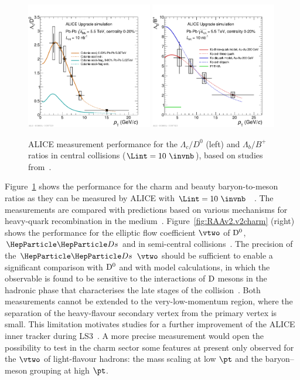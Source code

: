 \begin{figure}[!t]
\centering
\includegraphics[width=0.49\textwidth]{hf/figures/ALICE_LcOverD_YR.pdf}
\includegraphics[width=0.49\textwidth]{hf/figures/ALICE_LbOverB_YR.pdf}
\caption{ALICE measurement performance for the $\Lambda_c/D^0$ (left) and $\Lambda_b/B^+$ ratios in central \PbPb collisions ($\Lint=10~\invnb$), based on studies from~\cite{Abelev:1625842}.}
\label{fig:HFLcLb}
\end {figure}

Figure~\ref{fig:HFLcLb} shows the performance for the charm and beauty baryon-to-meson ratios as they can be measured by ALICE with $\Lint=10~\invnb$ ~\cite{Abelev:1625842}. The measurements are compared with predictions based on various mechanisms for heavy-quark recombination in the medium~\cite{Plumari:2017ntm,Oh:2009zj}.
Figure~\ref{fig:RAAv2.v2charm} (right) shows the performance for the elliptic flow coefficient $\vtwo$ of $\rm D^0$, $\PDs$ and \PGLc 
in semi-central \PbPb collisions~\cite{Abelev:1625842}. The precision of the $\PDs$ $\vtwo$ should be sufficient to enable a significant comparison with $\rm D^0$ and with model calculations, in which the 
observable is found to be sensitive to the interactions of $\rm D$ mesons in the hadronic phase that characterises the late stages of the collision~\cite{He:2014cla}. 
Both measurements cannot be extended to the very-low-momentum region, where the separation of the heavy-flavour secondary vertex from the primary vertex is small.  
This limitation motivates studies for a further improvement of the ALICE inner tracker during LS3~\cite{ALICEITS3}.  A more precise measurement would open the possibility to test in the charm sector some features at present only observed for the $\vtwo$ of light-flavour hadrons: the mass scaling at low $\pt$ and 
the baryon--meson grouping at high $\pt$.

